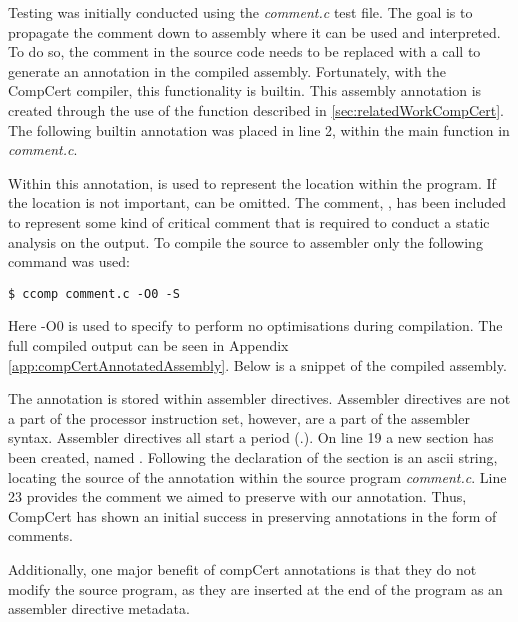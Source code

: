 Testing was initially conducted using the \textit{comment.c} test file. The goal is to propagate the comment down to assembly where it can be used and interpreted. To do so, the comment in the source code needs to be replaced with a call to generate an annotation in the compiled assembly. Fortunately, with the CompCert compiler, this functionality is builtin. This assembly annotation is created through the use of the  function described in \ref{sec:relatedWorkCompCert}. The following builtin annotation was placed in line 2, within the main function in \textit{comment.c}.



Within this annotation,  is used to represent the location within the program. If the location is not important,  can be omitted. The comment, , has been included to represent some kind of critical comment that is required to conduct a static analysis on the output. To compile the source to assembler only the following command was used:

\begin{lstlisting}[numbers=none]
$ ccomp comment.c -O0 -S
\end{lstlisting}

Here -O0 is used to specify to perform no optimisations during compilation. The full compiled output can be seen in Appendix \ref{app:compCertAnnotatedAssembly}. Below is a snippet of the compiled assembly.



The annotation is stored within assembler directives. Assembler directives are not a part of the processor instruction set, however, are a part of the assembler syntax. Assembler directives all start a period (.). On line 19 a new section has been created, named . Following the declaration of the section is an ascii string, locating the source of the annotation within the source program \textit{comment.c}. Line 23 provides the comment we aimed to preserve with our annotation. Thus, CompCert has shown an initial success in preserving annotations in the form of comments.

Additionally, one major benefit of compCert annotations is that they do not modify the source program, as they are inserted at the end of the program as an assembler directive metadata.

